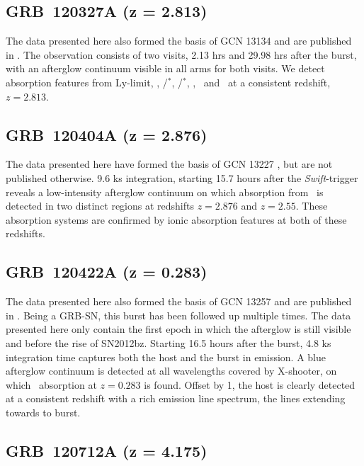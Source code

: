 \documentclass[longauth]{aa}    %
\begin{document}
\subsection{GRB~120327A (z = 2.813)} \label{120327}

The data presented here also formed the basis of GCN 13134 \citep{GCN13134} and
are published in \citet{DElia2014}. The observation consists of two visits, 2.13
hrs and 29.98 hrs after the burst, with an afterglow continuum visible in all
arms for both visits. We detect absorption features from Ly-limit, \lya,
\cii/\cii$^*$, \SIii/\SIii$^*$, \ali, \feii ~and \mgii~at a consistent redshift,
$z = 2.813$.

\subsection{GRB~120404A (z = 2.876)} \label{120404}

The data presented here have formed the basis of GCN 13227 \citep{GCN13227}, but
are not published otherwise. 9.6 ks integration, starting 15.7 hours after the
\textit{Swift}-trigger reveals a low-intensity afterglow continuum on which
absorption from \lya~is detected in two distinct regions at redshifts $z=2.876$
and $z=2.55$. These absorption systems are confirmed by ionic absorption
features at both of these redshifts.


\subsection{GRB~120422A (z = 0.283)} \label{120422}

The data presented here also formed the basis of GCN 13257 \citep{GCN13257} and
are published in \citet{Schulze2014}. Being a GRB-SN, this burst has been followed up
multiple times. The data presented here only contain the first epoch in which
the afterglow is still visible and before the rise of SN2012bz. Starting 16.5
hours after the burst, 4.8 ks integration time captures both the host and the
burst in emission. A blue afterglow continuum is detected at all wavelengths
covered by X-shooter, on which \mgii~absorption at $z = 0.283$ is found. Offset
by 1, the host is clearly detected at a consistent redshift with a rich
emission line spectrum, the lines extending towards to burst.

\subsection{GRB~120712A (z = 4.175)} \label{120712}
\end{document}
